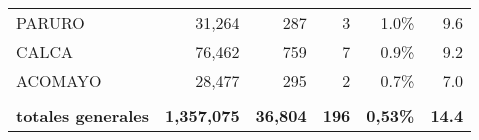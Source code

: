 \begin{tabular}{lrrrrr}
	\cellcolor[HTML]{FFFFC7}PARURO        & 31,264                                                         & 287                                                                             & 3                                                              & 1.0\%                                                                  & 9.6                                                                                                                                \\
	\cellcolor[HTML]{FFFFC7}CALCA         & 76,462                                                         & 759                                                                             & 7                                                              & 0.9\%                                                                  & 9.2                                                                                                                                \\
	\cellcolor[HTML]{FFFFC7}ACOMAYO       & 28,477                                                         & 295                                                                             & 2                                                              & 0.7\%                                                                  & 7.0                                                                                                                                \\
	&                                                                &                                                                                 &                                                                &                                                                        &                                                                                                                                    \\
	\rowcolor[HTML]{ECF4FF} 
	\textbf{totales generales}            & \textbf{1,357,075}                                             & \textbf{36,804}                                                                 & \textbf{196}                                                   & \textbf{0,53\%}                                                        & \textbf{14.4}                                                                                                                     
\end{tabular}

